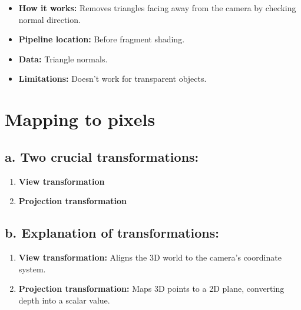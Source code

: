 \documentclass{article}
\begin{document}
\begin{itemize}
    \item \textbf{How it works:} Removes triangles facing away from the camera by checking normal direction.
    \item \textbf{Pipeline location:} Before fragment shading.
    \item \textbf{Data:} Triangle normals.
    \item \textbf{Limitations:} Doesn’t work for transparent objects.
\end{itemize}

\section{Mapping to pixels}

\subsection{a. Two crucial transformations:}

\begin{enumerate}
    \item \textbf{View transformation}
    \item \textbf{Projection transformation}
\end{enumerate}

\subsection{b. Explanation of transformations:}

\begin{enumerate}
    \item \textbf{View transformation:} Aligns the 3D world to the camera’s coordinate system.
    \item \textbf{Projection transformation:} Maps 3D points to a 2D plane, converting depth into a scalar value.
\end{enumerate}
\end{document}
